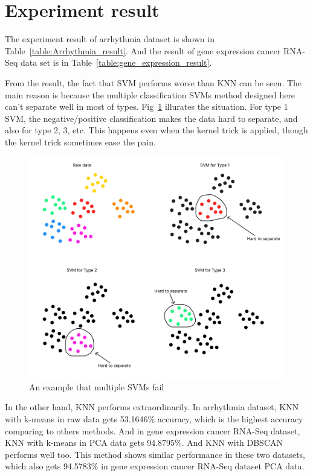 \documentclass[twocolumn,10pt]{article}
\begin{document}
\section{Experiment result}
  The experiment result of arrhythmia dataset is shown in Table~\ref{table:Arrhythmia_result}. And the result of gene 
  expression cancer RNA-Seq data set is in Table~\ref{table:gene_expression_result}. 

  From the result, the fact that SVM performs worse than KNN can be seen. The main reason is because the multiple 
  classification SVMs method designed here can't separate well in most of types. Fig~\ref{fig:SVM_fail} illurates the 
  situation. For type 1 SVM, the negative/positive classification makes the data hard to separate, and also for type 
  2, 3, etc. This happens even when the kernel trick is applied, though the kernel trick sometimes ease the pain. 
  \begin{figure}[htb]
    \centering
    \includegraphics[scale=0.15]{assets/SVM_fail.pdf}
    \caption{An example that multiple SVMs fail}
    \label{fig:SVM_fail}
  \end{figure}
  In the other hand, KNN performs extraordinarily. In arrhythmia dataset, KNN with k-means in raw data gets 53.1646\% 
  accuracy, which is the highest accuracy comparing to others methods. And in gene expression cancer RNA-Seq dataset, 
  KNN with k-means in PCA data gets 94.8795\%. And KNN with DBSCAN performs well too. This method shows similar performance 
  in these two datasets, which also gets 94.5783\% in gene expression cancer RNA-Seq dataset PCA data. 
\end{document}
